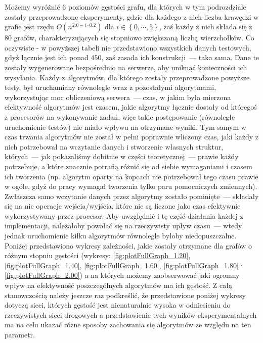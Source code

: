 Możemy wyróżnić $6$ poziomów gęstości grafu, dla których w tym podrozdziale zostały przeprowadzone eksperymenty, gdzie dla każdego z nich liczba krawędzi w grafie jest rzędu $ O \left( n^{2.0-i \cdot 0.2} \right)$ dla $i \in \left\{ 0, \cdots, 5 \right\}$, zaś każdy z nich składa się z $80$ grafów, charakteryzujących się stopniowo zwiększaną liczbą wierzchołków. Co oczywiste - w powyższej tabeli nie przedstawiono wszystkich danych testowych, gdyż łącznie jest ich ponad $450$, zaś zasada ich konstrukcji~--- taka sama. Dane te zostały wygenerowane bezpośrednio na serwerze, aby uniknąć konieczności ich wysyłania. Każdy z algorytmów, dla którego zostały przeprowadzone powyższe testy, był uruchamiany równolegle wraz z pozostałymi algorytmami, wykorzystując moc obliczeniową serwera~--- czas, w jakim była mierzona efektywność algorytmów jest czasem, jakie algorytmy łącznie dostały od któregoś z procesorów na wykonywanie zadań, więc takie postępowanie (równoległe uruchomienie testów) nie miało wpływu na otrzymane wyniki. Tym samym w czas trwania algorytmów nie został w pełni poprawnie wliczony czas, jaki każdy z nich potrzebował na wczytanie danych i stworzenie własnych struktur, których~--- jak pokazaliśmy dobitnie w części teoretycznej~--- prawie każdy potrzebuje, a które znacznie potrafią różnić się od siebie wymaganiami i czasem ich tworzenia (np. algorytm oparty na kopcach nie potrzebował tego czasu prawie w ogóle, gdyż do pracy wymagał tworzenia tylko paru pomocniczych zmiennych). Zwłaszcza samo wczytanie danych przez algorytmy zostało pominięte~--- składały się na nie operacje wejścia/wyjścia, które nie są liczone jako czas efektywnie wykorzystywany przez procesor. Aby uwzględnić i tę część działania każdej z implementacji, należałoby powołać się na rzeczywisty upływ czasu~--- wtedy jednak uruchomienie kilku algorytmów równolegle byłoby niedopuszczalne. Poniżej przedstawiono wykresy zależności, jakie zostały otrzymane dla grafów o różnym stopniu gęstości (wykresy: \ref{fig:plotFullGraph_1.20}, \ref{fig:plotFullGraph_1.40}, \ref{fig:plotFullGraph_1.60}, \ref{fig:plotFullGraph_1.80} i \ref{fig:plotFullGraph_2.00}) a na których możemy zaobserwować jaki ogromny wpływ na efektywność poszczególnych algorytmów ma ich gęstość. Z całą stanowczością należy jeszcze raz podkreślić, że przedstawione poniżej wykresy dotyczą sieci, których gęstość jest nienaturalnie wysoka w odniesieniu do rzeczywistych sieci drogowych a przedstawienie tych wyników eksperymentalnych ma na celu ukazać różne sposoby zachowania się algorytmów ze względu na ten parametr.

